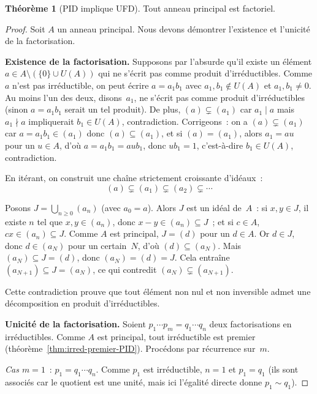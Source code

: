 \documentclass[12pt,a4paper,openany]{book}
\theoremstyle{definition}
\newtheorem{theoreme}{Théorème}[chapter]
\begin{document}
\begin{theoreme}[PID implique UFD]\label{thm:PID-UFD}
Tout anneau principal est factoriel.
\end{theoreme}

\begin{proof}
Soit $A$ un anneau principal. Nous devons démontrer l'existence et
l'unicité de la factorisation.

\medskip
\textbf{Existence de la factorisation.}
Supposons par l'absurde qu'il existe un élément
$a \in A \setminus (\{0\} \cup U(A))$ qui ne s'écrit pas comme produit
d'irréductibles. Comme $a$ n'est pas irréductible, on peut écrire
$a = a_1 b_1$ avec $a_1, b_1 \notin U(A)$ et $a_1, b_1 \neq 0$. Au
moins l'un des deux, disons~$a_1$, ne s'écrit pas comme produit
d'irréductibles (sinon $a = a_1 b_1$ serait un tel produit). De plus,
$(a) \subsetneq (a_1)$ car $a_1 \mid a$ mais $a_1 \nmid a$ impliquerait
$b_1 \in U(A)$, contradiction. Corrigeons~: on a $(a) \subsetneq (a_1)$
car $a = a_1 b_1 \in (a_1)$ donc $(a) \subseteq (a_1)$, et si
$(a) = (a_1)$, alors $a_1 = au$ pour un $u \in A$, d'où $a = a_1 b_1
= aub_1$, donc $ub_1 = 1$, c'est-à-dire $b_1 \in U(A)$, contradiction.

En itérant, on construit une chaîne strictement croissante d'idéaux~:
\[
  (a) \subsetneq (a_1) \subsetneq (a_2) \subsetneq \cdots
\]

Posons $J = \bigcup_{n \geqslant 0} (a_n)$ (avec $a_0 = a$). Alors $J$
est un idéal de~$A$~: si $x, y \in J$, il existe $n$ tel que
$x, y \in (a_n)$, donc $x - y \in (a_n) \subseteq J$~; et si $c \in A$,
$cx \in (a_n) \subseteq J$. Comme $A$ est principal, $J = (d)$ pour un
$d \in A$. Or $d \in J$, donc $d \in (a_N)$ pour un certain~$N$, d'où
$(d) \subseteq (a_N)$. Mais $(a_N) \subseteq J = (d)$, donc
$(a_N) = (d) = J$. Cela entraîne $(a_{N+1}) \subseteq J = (a_N)$,
ce qui contredit $(a_N) \subsetneq (a_{N+1})$.

Cette contradiction prouve que tout élément non nul et non inversible
admet une décomposition en produit d'irréductibles.

\medskip
\textbf{Unicité de la factorisation.}
Soient $p_1 \cdots p_m = q_1 \cdots q_n$ deux factorisations en
irréductibles. Comme $A$ est principal, tout irréductible est premier
(théorème~\ref{thm:irred-premier-PID}). Procédons par récurrence
sur~$m$.

\emph{Cas $m = 1$}~: $p_1 = q_1 \cdots q_n$. Comme $p_1$ est
irréductible, $n = 1$ et $p_1 = q_1$ (ils sont associés car le quotient
est une unité, mais ici l'égalité directe donne $p_1 \sim q_1$).


\end{proof}
\end{document}

